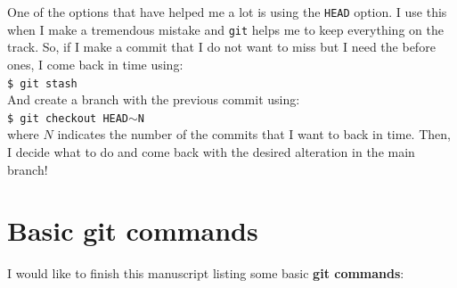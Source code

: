 \documentclass[12pt,a4paper,titlepage,brazil]{article}
\begin{document}
{One of the options that have helped me a lot is using the \texttt{HEAD} option. I use this when I make a tremendous mistake and \texttt{git} helps me to keep everything on the track. So, if I make a commit that I do not want to miss but I need the before ones, I come back in time using:\\

\texttt{\$ git stash}\\

And create a branch with the previous commit using:\\

\texttt{\$ git checkout HEAD$\sim$N}\\

where $N$ indicates the number of the commits that I want to back in time. Then, I decide what to do and come back with the desired alteration in the main branch!


\section{Basic git commands}

I would like to finish this manuscript listing some basic {\bf git commands}:

}
\end{document}
